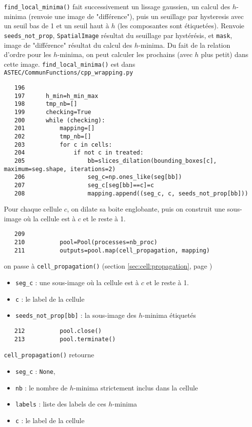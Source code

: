 \documentclass{article}
\def \mycolor {red}
\begin{document}
\color{\mycolor}
\texttt{find\_local\_minima()} fait successivement un lissage gaussien, un calcul des $h$-minima (renvoie une image de "diff\'erence"), puis un seuillage par hysteresis avec un seuil bas de 1 et un seuil haut \`a $h$ (les composantes sont \'etiquet\'ees).
Renvoie \verb|seeds_not_prop|, \texttt{SpatialImage} r\'esultat du seuillage par hyst\'er\'esis, et \verb|mask|, image de "diff\'erence" r\'esultat du calcul des $h$-minima. Du fait de la relation d'ordre pour les $h$-minima, on peut calculer les prochains (avec $h$ plus petit) dans cette image.
\texttt{find\_local\_minima()} est dans \texttt{ASTEC/CommunFunctions/cpp\_wrapping.py}
\color{black}
\begin{verbatim}  
   196	
   197	    h_min=h_min_max
   198	    tmp_nb=[]
   199	    checking=True
   200	    while (checking):
   201	        mapping=[]
   202	        tmp_nb=[]
   203	        for c in cells:
   204	            if not c in treated:
   205	                bb=slices_dilation(bounding_boxes[c], maximum=seg.shape, iterations=2)
   206	                seg_c=np.ones_like(seg[bb])
   207	                seg_c[seg[bb]==c]=c
   208	                mapping.append((seg_c, c, seeds_not_prop[bb]))
\end{verbatim} 
\color{\mycolor}
Pour chaque cellule $c$, on dilate sa boite englobante, puis on construit une sous-image o\`u la cellule est \`a $c$ et le reste \`a 1.
\color{black}
\begin{verbatim}  
   209	
   210	        pool=Pool(processes=nb_proc)
   211	        outputs=pool.map(cell_propagation, mapping)
\end{verbatim} 
\color{\mycolor}
on passe \`a \texttt{cell\_propagation()} (section \ref{sec:cell:propagation}, page \pageref{sec:cell:propagation})
\begin{itemize}
\itemsep -1ex
\item \verb|seg_c| : une sous-image o\`u la cellule est \`a $c$ et le reste \`a 1.
\item \verb|c| : le label de la cellule
\item \verb|seeds_not_prop[bb]| : la sous-image des $h$-minima \'etiquet\'es
\end{itemize}
\color{black}
\begin{verbatim}  
   212	        pool.close()
   213	        pool.terminate()
\end{verbatim} 
\color{\mycolor}
\texttt{cell\_propagation()} retourne
\begin{itemize}
\itemsep -1ex
\item \verb|seg_c| : \texttt{None},
\item \verb|nb| : le nombre de $h$-minima strictement inclus dans la cellule
\item \verb|labels| : liste des labels de ces $h$-minima
\item \verb|c| : le label de la cellule
\end{itemize}
\end{document}
